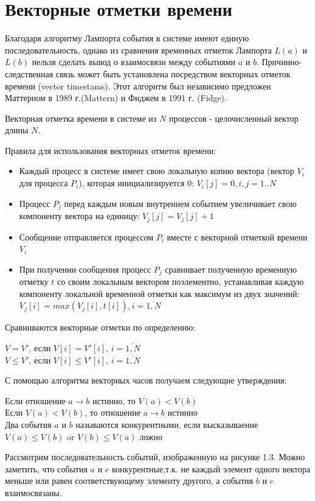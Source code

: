 \section{Векторные отметки времени} 
Благодаря алгоритму Лампорта события в системе имеют единую последовательность, однако из сравнения временных отметок Лампорта $L(a)$ и $L(b)$  нельзя сделать вывод о взаимосвязи между событиями $a$ и $b$. Причинно-следственная связь может быть установлена посредством векторных
отметок времени (vector timestams). Этот алгоритм был независимо предложен Маттерном в 1989 г.(Mattern) и Фиджем в 1991 г. (Fidge).\par
Векторная отметка времени в системе из $N$ процессов - целочисленный вектор длины $N$.\par
Правила для использования векторных отметок времени:  
\begin{itemize}
\item Каждый процесс в системе имеет свою локальную копию вектора (вектор $V_i$ для процесса $P_i$), которая инициализируется $0$: $V_i[j] = 0, i,j = 1..N$ 
\item Процесс $P_j$ перед каждым новым внутреннем событием увеличивает свою компоненту вектора на единицу: $V_j[j] = V_j[j] + 1$
\item Сообщение отправляется процессом $P_i$ вместе с векторной отметкой времени $V_i$
\item При получении сообщения процесс $P_j$ сравнивает полученную временную отметку $t$ со своим локальным вектором поэлементно, устанавливая каждую компоненту локальной временной отметки как максимум из двух значений: $V_j[i] = max(V_j[i],t[i]), i = \overline{1,N}$
\end{itemize}
Сравниваются векторные отметки по определению: 
\begin{center}
$V = V'$, если $V[i] = V'[i]$, $i = \overline{1,N}$ \\
$V \leq V'$, если $V[i] \leq V'[i]$, $i = \overline{1,N}$ 
\end{center}
С помощью алгоритма векторных часов получаем следующие утверждения:
\begin{center}
Если отношение $a \rightarrow b$ истинно, то $V(a) < V(b)$\\
Если $V(a) < V(b)$, то отношение $a \rightarrow b$ истинно \\
Два события $a$ и $b$ называются конкурентными, если высказываение $V(a)\leq V(b)$ or $V(b)\leq V(a)$ ложно
\end{center}
Рассмотрим последовательность событий, изображенную на рисунке 1.3. Можно заметить, что события $a$ и $e$ конкурентные,т.к. не каждый элемент одного вектора меньше или равен соответствующему элементу другого, а события $b$ и $c$ взаимосвязаны. 

